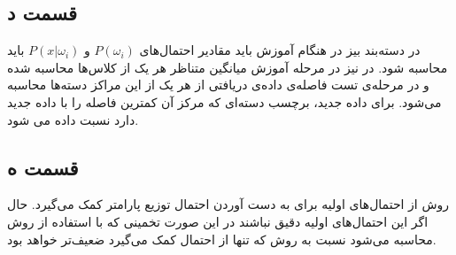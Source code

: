 \documentclass{article}
\begin{document}
\subsection*{قسمت د}

در دسته‌بند بیز در هنگام آموزش باید مقادیر احتمال‌های $P(\omega_i)$ و $P(x|\omega_i)$ باید محاسبه شود.
در  نیز در مرحله‌ آموزش میانگین متناظر هر یک از کلاس‌ها محاسبه شده و در مرحله‌ی تست فاصله‌ی
داده‌ی دریافتی از هر یک از این مراکز دسته‌ها محاسبه می‌شود. برای داده جدید، برچسب دسته‌ای که مرکز آن کمترین فاصله
را با داده جدید دارد نسبت داده می شود.

\subsection*{قسمت ه}

روش  از احتمال‌های اولیه برای به دست آوردن احتمال توزیع پارامتر کمک می‌گیرد. حال اگر این احتمال‌های
اولیه دقیق نباشند در این صورت تخمینی که با استفاده از روش  محاسبه می‌شود نسبت به روش 
که تنها از احتمال  کمک می‌گیرد ضعیف‌تر خواهد بود.
\end{document}
